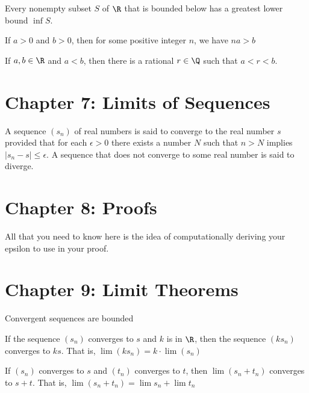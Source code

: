 \documentclass[10pt]{article}
\begin{document}
\begin{cor}
Every nonempty subset $S$ of $\R$ that is bounded below has a greatest lower bound $\inf S$.
\end{cor}

\begin{thm} 
If $a > 0$ and $b > 0$, then for some positive integer $n$, we have $na > b$
\end{thm}

\begin{thm} [Density of $\Q$]
If $a,b \in \R$ and $a < b$, then there is a rational $r\in\Q$ such that $a < r < b$.
\end{thm}

\section*{Chapter 7: Limits of Sequences}
\begin{defn}[Convergence]
A sequence $(s_n)$ of real numbers is said to converge to the real number $s$ provided that for each $\epsilon > 0$ there exists a number $N$ such that $n > N$ implies $|s_n - s| \leq \epsilon$. A sequence that does not converge to some real number is said to diverge.
\end{defn}

\section*{Chapter 8: Proofs}
All that you need to know here is the idea of computationally deriving your epsilon to use in your proof.

\section*{Chapter 9: Limit Theorems}
\begin{thm}
Convergent sequences are bounded
\end{thm}

\begin{thm}
If the sequence $(s_n)$ converges to $s$ and $k$ is in $\R$, then the sequence $(ks_n)$ converges to $ks$. That is, $\lim(ks_n) = k\cdot\lim(s_n)$
\end{thm}

\begin{thm}
If $(s_n)$ converges to $s$ and $(t_n)$ converges to $t$, then $\lim(s_n + t_n)$ converges to $s + t$. That is, $\lim(s_n + t_n) = \lim s_n + \lim t_n$
\end{thm}
\end{document}
